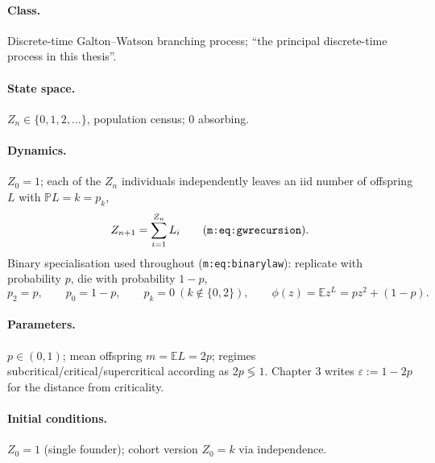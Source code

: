 \documentclass[11pt,a4paper]{article}
\newcommand{\PR}{\mathbb{P}}
\newcommand{\EX}{\mathbb{E}}
\begin{document}
\paragraph{Class.} Discrete-time Galton--Watson branching process; ``the
principal discrete-time process in this thesis''.

\paragraph{State space.} $Z_n\in\{0,1,2,\ldots\}$, population census;
$0$ absorbing.

\paragraph{Dynamics.} $Z_0=1$; each of the $Z_n$ individuals independently
leaves an iid number of offspring $L$ with $\PR{L=k}=p_k$,
\[
Z_{n+1}=\sum_{i=1}^{Z_n}L_i
\qquad\text{(\texttt{m:eq:gwrecursion})}.
\]
Binary specialisation used throughout (\texttt{m:eq:binarylaw}): replicate
with probability $p$, die with probability $1-p$,
\[
p_2=p,\qquad p_0=1-p,\qquad p_k=0\ (k\notin\{0,2\}),\qquad
\phi(z)=\EX{z^L}=pz^2+(1-p).
\]

\paragraph{Parameters.} $p\in(0,1)$; mean offspring $m=\EX{L}=2p$;
regimes subcritical/critical/supercritical according as $2p\lessgtr1$.
Chapter 3 writes $\varepsilon:=1-2p$ for the distance from criticality.

\paragraph{Initial conditions.} $Z_0=1$ (single founder); cohort version
$Z_0=k$ via independence.
\end{document}
